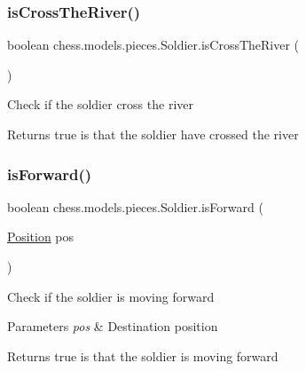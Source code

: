 \subsubsection{\texorpdfstring{is\+Cross\+The\+River()}{isCrossTheRiver()}}
{\footnotesize\ttfamily boolean chess.\+models.\+pieces.\+Soldier.\+is\+Cross\+The\+River (\begin{DoxyParamCaption}{ }\end{DoxyParamCaption})}

Check if the soldier cross the river

\begin{DoxyReturn}{Returns}
true is that the soldier have crossed the river 
\end{DoxyReturn}
\mbox{\label{classchess_1_1models_1_1pieces_1_1_soldier_a3be305544d8e788663b6c394d334f596}} 
\subsubsection{\texorpdfstring{is\+Forward()}{isForward()}}
{\footnotesize\ttfamily boolean chess.\+models.\+pieces.\+Soldier.\+is\+Forward (\begin{DoxyParamCaption}\item[{\mbox{\hyperlink{classchess_1_1models_1_1_position}{Position}}}]{pos }\end{DoxyParamCaption})}

Check if the soldier is moving forward


\begin{DoxyParams}{Parameters}
{\em pos} & Destination position \\
\hline
\end{DoxyParams}
\begin{DoxyReturn}{Returns}
true is that the soldier is moving forward 
\end{DoxyReturn}
\mbox{\label{classchess_1_1models_1_1pieces_1_1_soldier_a5a0cc5ebe1f0a4b2b68b9359f5bad0c5}} 
